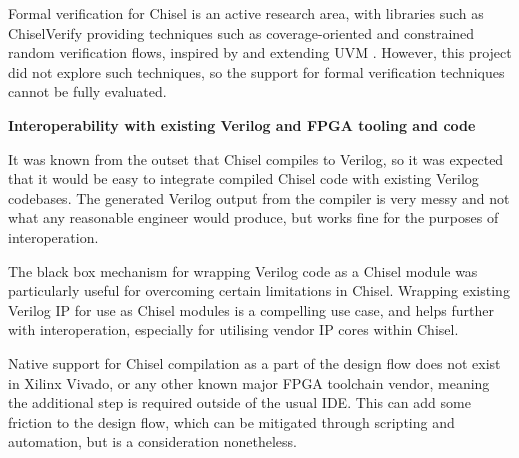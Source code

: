 Formal verification for Chisel is an active research area, with libraries such as ChiselVerify providing techniques such as coverage-oriented and constrained random verification flows, inspired by and extending UVM \cite{chiselverify}. However, this project did not explore such techniques, so the support for formal verification techniques cannot be fully evaluated.

\textbf{Interoperability with existing Verilog and FPGA tooling and code}

It was known from the outset that Chisel compiles to Verilog, so it was expected that it would be easy to integrate compiled Chisel code with existing Verilog codebases. The generated Verilog output from the compiler is very messy and not what any reasonable engineer would produce, but works fine for the purposes of interoperation.

The black box mechanism for wrapping Verilog code as a Chisel module was particularly useful for overcoming certain limitations in Chisel. Wrapping existing Verilog IP for use as Chisel modules is a compelling use case, and helps further with interoperation, especially for utilising vendor IP cores within Chisel.

Native support for Chisel compilation as a part of the design flow does not exist in Xilinx Vivado, or any other known major FPGA toolchain vendor, meaning the additional step is required outside of the usual IDE. This can add some friction to the design flow, which can be mitigated through scripting and automation, but is a consideration nonetheless.

